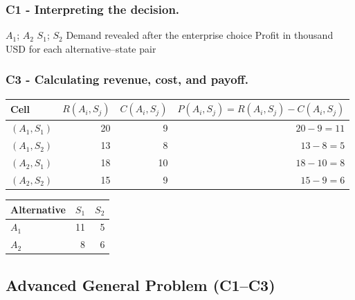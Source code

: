 \subsubsection*{C1 - Interpreting the decision.}
\label{subsec:problem1-introductory-general-c1}

\DecisionElementsTable
{\(A_1\); \(A_2\)}
{\(S_1\); \(S_2\)}
{Demand revealed after the enterprise choice}
{Profit in thousand USD for each alternative--state pair}


\subsubsection*{C3 - Calculating revenue, cost, and payoff.}
\label{subsec:problem1-introductory-general-c3}

\begin{center}
	\small
	\begin{tabular}{lrrr}
		\toprule
		Cell
		& \(R(A_i,S_j)\)
		& \(C(A_i,S_j)\)
		& \(P(A_i,S_j)=R(A_i,S_j)-C(A_i,S_j)\) \\
		\midrule
		\((A_1,S_1)\) & 20 & 9  & \(20-9=11\) \\
		\((A_1,S_2)\) & 13 & 8  & \(13-8=5\) \\
		\((A_2,S_1)\) & 18 & 10 & \(18-10=8\) \\
		\((A_2,S_2)\) & 15 & 9  & \(15-9=6\) \\
		\bottomrule
	\end{tabular}
\end{center}

\begin{center}
	\begin{tabular}{lrr}
		\toprule
		Alternative & \(S_1\) & \(S_2\) \\
		\midrule
		\(A_1\) & 11 & 5 \\
		\(A_2\) & 8  & 6 \\
		\bottomrule
	\end{tabular}
\end{center}


\subsection{Advanced General Problem (C1--C3)}
\label{sec:problem2-advanced-general-c1-c3}

